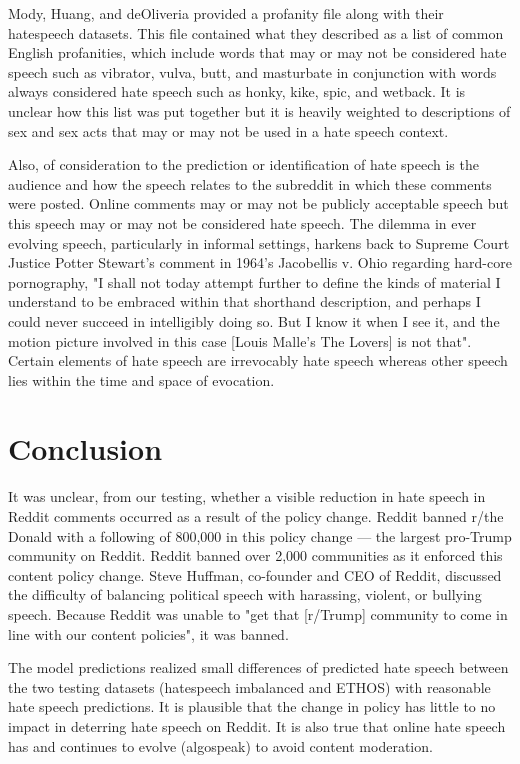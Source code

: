 \documentclass[conference]{IEEEtran}
\begin{document}
Mody, Huang, and deOliveria\cite{b8} provided a profanity file along with their hatespeech\cite{b8} datasets. This file contained what they described as a list of common English profanities, which include words that may or may not be considered hate speech such as vibrator, vulva, butt, and masturbate in conjunction with words always considered hate speech such as honky, kike, spic, and wetback. It is unclear how this list was put together but it is heavily weighted to descriptions of sex and sex acts that may or may not be used in a hate speech context. 

Also, of consideration to the prediction or identification of hate speech is the audience and how the speech relates to the subreddit in which these comments were posted. Online comments may or may not be publicly acceptable speech but this speech may or may not be considered hate speech. The dilemma in ever evolving speech, particularly in informal settings, harkens back to Supreme Court Justice Potter Stewart's comment in 1964's Jacobellis v. Ohio regarding hard-core pornography, "I shall not today attempt further to define the kinds of material I understand to be embraced within that shorthand description, and perhaps I could never succeed in intelligibly doing so. But I know it when I see it, and the motion picture involved in this case [Louis Malle's The Lovers] is not that"\cite{b24}. Certain elements of hate speech are irrevocably hate speech whereas other speech lies within the time and space of evocation. 

\section{Conclusion}
It was unclear, from our testing, whether a visible reduction in hate speech in Reddit comments occurred as a result of the policy change. Reddit banned r/the Donald with a following of 800,000 in this policy change --- the largest pro-Trump community on Reddit. Reddit banned over 2,000 communities as it enforced this content policy change. Steve Huffman, co-founder and CEO of Reddit, discussed the difficulty of balancing political speech with harassing, violent, or bullying speech. Because Reddit was unable to "get that [r/Trump] community to come in line with our content policies"\cite{b25}, it was banned. 

The model predictions realized small differences of predicted hate speech between the two testing datasets (hatespeech imbalanced and ETHOS) with reasonable hate speech predictions. It is plausible that the change in policy has little to no impact in deterring hate speech on Reddit. It is also true that online hate speech has and continues to evolve (algospeak) to avoid content moderation. 
\end{document}
